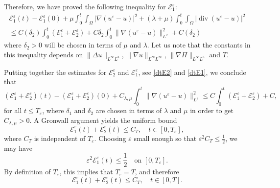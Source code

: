 \documentclass[11pt, twoside, a4paper]{article}
\theoremstyle{plain}
\theoremstyle{remark}
\numberwithin{equation}{section}
\def\EE{{\mathcal E}}
\renewcommand{\div}{\operatorname{div}}
\renewcommand{\leq}{\leqslant}\renewcommand{\le}{\leqslant}
\renewcommand{\epsilon}{\varepsilon}
\newcommand{\eps}{\varepsilon}
\begin{document}
Therefore, we have proved the following inequality for $\EE^\eps_1$:
\begin{multline}\label{dtE1}
 \EE^\eps_1(t) - \EE^\eps_1(0) + \mu \int_0^t\!\!\! \int_{\Omega} \left\lvert \nabla (u^{\epsilon}-u) \right\rvert^2 + (\lambda+\mu) \int_0^t\!\!\! \int_{\Omega} \left\lvert \div (u^{\epsilon}-u) \right\rvert^2 \\
 \leq C(\delta_2) \int_0^t (\EE^\eps_1 +\EE^\eps_{2}) + C\delta_2 \int_0^t \lVert \nabla( u^\eps - u) \rVert_{L^2}^2 + C(\delta_2) 
\end{multline}
where $\delta_2>0$ will be chosen in terms of $\mu$ and $\lambda$. Let us note that the constants in this inequality depends on $\|\Delta u\|_{L^\infty L^3}$, $\|\nabla u\|_{L^\infty L^\infty}$, $\|\nabla \Pi\|_{L^\infty L^3}$ and $T$.



Putting together the estimates for $\EE^\eps_{2}$ and $\EE^\eps_1$, see \eqref{dtE2} and \eqref{dtE1}, we conclude that
\begin{equation}\label{dtE12}
 (\EE^\eps_1+\EE^\eps_2)(t) - (\EE^\eps_1+\EE^\eps_2)(0) + C_{\lambda,\mu} \int_0^t\!\!\! \lVert \nabla( u^\eps - u) \rVert_{L^2}^2 
 \leq C\int_0^t (\EE_1^\eps+\EE^\eps_2) +C,
\end{equation}
for all $t\leq T_\eps$, where $\delta_1$ and $\delta_2$ are chosen in terms of $\lambda$ and $\mu$ in order to get $C_{\lambda,\mu}>0$.
A Gronwall argument yields the uniform bound
\[
\EE^\eps_1(t) + \EE^\eps_2(t) \le C_T, \quad t \in [0,T_\eps],
\]
where $C_T$ is independent of $T_\eps$. Choosing $\eps$ small enough so that $\eps^2 C_T \le \frac12$, we may have
\[
\eps^2 \EE^\eps_1(t) \le \frac12 \quad \text{on } [0,T_\eps].
\]
By definition of $T_\eps$, this implies that $T_\eps = T$, and therefore
\[
\EE^\eps_1(t) + \EE^\eps_2(t) \le C_T, \quad t \in [0,T].
\]
\end{document}
